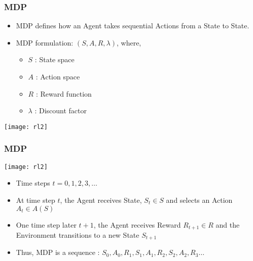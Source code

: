 \begin{frame}[fragile]\frametitle{MDP}

\begin{itemize}
\item MDP defines how an Agent takes sequential Actions from a State to State.
\item MDP formulation: $(S,A,R,\lambda)$, where,
	\begin{itemize}
	\item $S$ : State space
	\item $A$ : Action space
	\item $R$ : Reward function
	\item $\lambda$ : Discount factor
	\end{itemize}
\end{itemize}

\begin{center}
\texttt{[image: rl2]}
\end{center}

\end{frame}

\begin{frame}[fragile]\frametitle{MDP}

\begin{center}
\texttt{[image: rl2]}
\end{center}

\begin{itemize}
\item Time steps $t = 0,1,2,3,\ldots$
\item At time step $t$, the Agent receives State, $S_t \in S$ and selects an Action $A_t \in A(S)$
\item One time step later $t+1$, the Agent receives Reward $R_{t+1} \in R$ and the Environment transitions to a new State $S_{t+1}$
\item Thus, MDP is a sequence : $S_0,A_0,R_1,S_1,A_1,R_2,S_2,A_2,R_3\ldots$
\end{itemize}

\end{frame}

